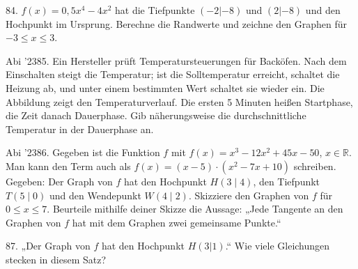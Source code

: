 \documentclass[11pt]{article}
\begin{document}
\pfgruppe{}
\begin{pfaufg}{}{84.}{}
$f(x) = 0{,}5x^4 - 4x^2$ hat die Tiefpunkte $(-2 | -8)$ und $(2 | -8)$ und den Hochpunkt im Ursprung. Berechne die Randwerte und zeichne den Graphen für $-3 \le x \le 3$.
\par\smallskip\noindent \begin{ksys}[xmin=-4,xmax=4,ymin=-9,ymax=5]\end{ksys}\par
{}
\end{pfaufg}
\pfgruppe{}
\begin{pfaufg}{Abi ’23}{85.}{}
Ein Hersteller prüft Temperatursteuerungen für Backöfen. Nach dem Einschalten steigt die Temperatur; ist die Solltemperatur erreicht, schaltet die Heizung ab, und unter einem bestimmten Wert schaltet sie wieder ein. Die Abbildung zeigt den Temperaturverlauf. Die ersten 5 Minuten heißen Startphase, die Zeit danach Dauerphase. Gib näherungsweise die durchschnittliche Temperatur in der Dauerphase an.
\par\smallskip\noindent {}\par
{}
\end{pfaufg}
\pfgruppe{}
\begin{pfaufg}{Abi ’23}{86.}{}
Gegeben ist die Funktion $f$ mit $f(x) = x^3 - 12x^2 + 45x - 50$, $x \in \mathbb{R}$. Man kann den Term auch als $f(x) = (x - 5)\cdot(x^2 - 7x + 10)$ schreiben. Gegeben: Der Graph von $f$ hat den Hochpunkt $H(3 \mid 4)$, den Tiefpunkt $T(5 \mid 0)$ und den Wendepunkt $W(4 \mid 2)$. Skizziere den Graphen von $f$ für $0 \le x \le 7$. Beurteile mithilfe deiner Skizze die Aussage: „Jede Tangente an den Graphen von $f$ hat mit dem Graphen zwei gemeinsame Punkte.“
\end{pfaufg}
\begin{pfaufg}{}{87.}{}
„Der Graph von $f$ hat den Hochpunkt $H(3|1)$.“ Wie viele Gleichungen stecken in diesem Satz? 
\end{pfaufg}
\end{document}
